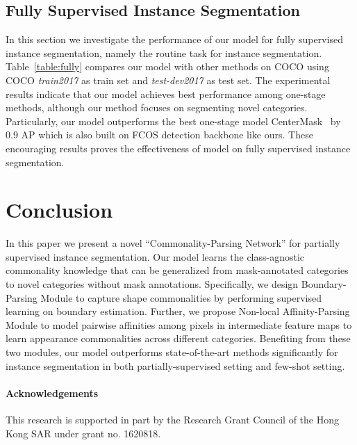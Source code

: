 \documentclass[runningheads]{llncs}
\newcommand{\mymodel}{Commonality-Parsing Network\xspace}
\begin{document}
\subsection{Fully Supervised Instance Segmentation}
\vspace{-2mm}
In this section we investigate the performance of our model for fully supervised instance segmentation, namely the routine task for instance segmentation.
Table~\ref{table:fully} compares our model with other methods on COCO using COCO \emph{train2017} as train set and \emph{test-dev2017} as test set. The experimental results indicate that our model achieves best performance among one-stage methods, although our method focuses on segmenting novel categories. Particularly, our model outperforms the best one-stage model CenterMask~\cite{lee2019centermask} by 0.9 AP which is also built on FCOS detection backbone like ours.
These encouraging results proves the effectiveness of model on fully supervised instance segmentation. 




\vspace{-3mm}

\section{Conclusion}
\vspace{-2mm}
In this paper we present a novel ``\mymodel'' for partially supervised instance segmentation. Our model learns the class-agnostic commonality knowledge that can be generalized from mask-annotated categories to novel categories without mask annotations. Specifically, we design Boundary-Parsing Module to capture shape commonalities by performing supervised learning on boundary estimation. Further, we propose Non-local Affinity-Parsing Module to model pairwise affinities among pixels in intermediate feature maps to learn appearance commonalities across different categories. Benefiting from these two modules, our model outperforms state-of-the-art methods significantly for instance segmentation in both partially-supervised setting and few-shot setting.

 \paragraph{{\bf Acknowledgements}}
 This research is supported in part by the Research Grant Council of the Hong Kong SAR under grant no. 1620818.

\clearpage


\end{document}
